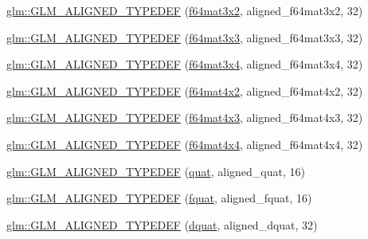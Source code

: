 \begin{DoxyCompactItemize}
\item 
\hyperlink{group__gtx__type__aligned_ga9ddf5212777734d2fd841a84439f3bdf}{glm\+::\+G\+L\+M\+\_\+\+A\+L\+I\+G\+N\+E\+D\+\_\+\+T\+Y\+P\+E\+D\+EF} (\hyperlink{group__gtc__type__precision_ga311a3bf48bfe2c95150e9f71db9063c5}{f64mat3x2}, aligned\+\_\+f64mat3x2, 32)
\item 
\hyperlink{group__gtx__type__aligned_gad1dda32ed09f94bfcf0a7d8edfb6cf13}{glm\+::\+G\+L\+M\+\_\+\+A\+L\+I\+G\+N\+E\+D\+\_\+\+T\+Y\+P\+E\+D\+EF} (\hyperlink{group__gtc__type__precision_ga3b494201796c4200886e59f9695ecff0}{f64mat3x3}, aligned\+\_\+f64mat3x3, 32)
\item 
\hyperlink{group__gtx__type__aligned_ga5875e0fa72f07e271e7931811cbbf31a}{glm\+::\+G\+L\+M\+\_\+\+A\+L\+I\+G\+N\+E\+D\+\_\+\+T\+Y\+P\+E\+D\+EF} (\hyperlink{group__gtc__type__precision_gaddb7f46e5a007c31348305de542e0d52}{f64mat3x4}, aligned\+\_\+f64mat3x4, 32)
\item 
\hyperlink{group__gtx__type__aligned_ga41e82cd6ac07f912ba2a2d45799dcf0d}{glm\+::\+G\+L\+M\+\_\+\+A\+L\+I\+G\+N\+E\+D\+\_\+\+T\+Y\+P\+E\+D\+EF} (\hyperlink{group__gtc__type__precision_ga704001c2ed5838498ff61f55995fed3a}{f64mat4x2}, aligned\+\_\+f64mat4x2, 32)
\item 
\hyperlink{group__gtx__type__aligned_ga0892638d6ba773043b3d63d1d092622e}{glm\+::\+G\+L\+M\+\_\+\+A\+L\+I\+G\+N\+E\+D\+\_\+\+T\+Y\+P\+E\+D\+EF} (\hyperlink{group__gtc__type__precision_gaf9b2bfbb2c79a39c693e2ab2bedf30e5}{f64mat4x3}, aligned\+\_\+f64mat4x3, 32)
\item 
\hyperlink{group__gtx__type__aligned_ga912a16432608b822f1e13607529934c1}{glm\+::\+G\+L\+M\+\_\+\+A\+L\+I\+G\+N\+E\+D\+\_\+\+T\+Y\+P\+E\+D\+EF} (\hyperlink{group__gtc__type__precision_ga5fc21633b1546e4599609c47b4c8dac4}{f64mat4x4}, aligned\+\_\+f64mat4x4, 32)
\item 
\hyperlink{group__gtx__type__aligned_gafd945a8ea86b042aba410e0560df9a3d}{glm\+::\+G\+L\+M\+\_\+\+A\+L\+I\+G\+N\+E\+D\+\_\+\+T\+Y\+P\+E\+D\+EF} (\hyperlink{fwd_8hpp_ac1f6a5957091b849730ea6f05a6b7ad6}{quat}, aligned\+\_\+quat, 16)
\item 
\hyperlink{group__gtx__type__aligned_gad8c4bfacff70e57dc8303634c8bfce35}{glm\+::\+G\+L\+M\+\_\+\+A\+L\+I\+G\+N\+E\+D\+\_\+\+T\+Y\+P\+E\+D\+EF} (\hyperlink{fwd_8hpp_aa95d73f08018f3864c6ae08dbf1c59f2}{fquat}, aligned\+\_\+fquat, 16)
\item 
\hyperlink{group__gtx__type__aligned_gaabc28c84a3288b697605d4688686f9a9}{glm\+::\+G\+L\+M\+\_\+\+A\+L\+I\+G\+N\+E\+D\+\_\+\+T\+Y\+P\+E\+D\+EF} (\hyperlink{fwd_8hpp_a49693161673a003b4a8fd4d8b15b0b7b}{dquat}, aligned\+\_\+dquat, 32)

\end{DoxyCompactItemize}
